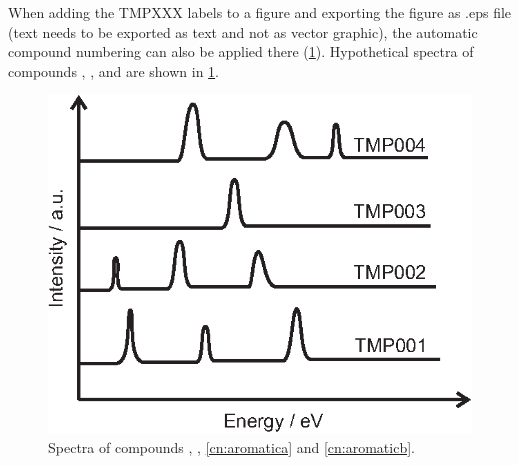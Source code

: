 \documentclass[11pt,a4paper]{article} %
\DeclareRobustCommand*{\CNrefsub}[2]{\ref{cn:#1#2}} %
\begin{document}
When adding the TMPXXX labels to a figure and exporting the figure as .eps file (text needs to be exported as text and not as vector graphic), the automatic compound numbering can also be applied there (\ref{fig:figure2}). Hypothetical spectra of compounds , ,  and  are shown in \ref{fig:figure2}.

\begin{figure}
	\centering
	\includegraphics{figures/figure2.eps}
	\caption{Spectra of compounds , , \CNrefsub{aromatic}{a} and \CNrefsub{aromatic}{b}.}
	\label{fig:figure2}
\end{figure}
\end{document}
